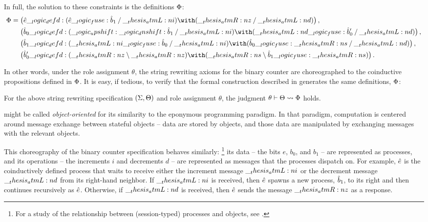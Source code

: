 %
In full, the solution to these constraints is the definitions $\Phi$:
\begin{equation*}
  \orsig =
  \begin{lgathered}[t]
    \bigl(\defp{e} \defd (\defp{e} \fuse \defp{b}_1 \pmir \atmL{i}) \with (\atmR{z} \pmir \atmL{d})\bigr) \,, \\
    \bigl(\defp{b}_0 \defd (\up \dn \defp{b}_1 \pmir \atmL{i}) \with (\atmL{d} \fuse \defp{b}'_0 \pmir \atmL{d})\bigr) \,, \\
    \bigl(\defp{b}_1 \defd (\atmL{i} \fuse \defp{b}_0 \pmir \atmL{i}) \with (\defp{b}_0 \fuse \atmR{s} \pmir \atmL{d})\bigr) \,, \\
    \bigl(\defp{b}'_0 \defd (\atmR{z} \limp \atmR{z}) \with (\atmR{s} \limp \defp{b}_1 \fuse \atmR{s})\bigr)
  \,.
  \end{lgathered}
\end{equation*}



In other words, under the role assignment $\theta$, the string rewriting axioms for the binary counter are choreographed to the coinductive propositions defined in $\Phi$.
It is easy, if tedious, to verify that 
the formal construction described in  generates the same definitions, $\Phi$:
%
\begin{proposition}
  For the above string rewriting specification $(\Sigma, \Theta)$ and role assignment $\theta$, the judgment $\theta \vdash \Theta \rightsquigarrow \Phi$ holds.
\end{proposition}

 might be called \emph{object-oriented} for its similarity to the eponymous programming paradigm.
In that paradigm, computation is centered around message exchange between stateful objects -- data are stored by objects, and those data are manipulated by exchanging messages with the relevant objects.

This choreography of the binary counter specification behaves similarly:%
\footnote{For a study of the relationship between (session-typed) processes and objects, see \textcite{Balzer+Pfenning:AGERE15}.}
its data -- the bits $e$, $b_0$, and $b_1$ -- are represented as processes, and its operations -- the increments $i$ and decrements $d$ -- are represented as messages that the processes dispatch on.
%
%
For example, $\hat{e}$ is the coinductively defined process that waits to receive either the increment message $\__thesis_atmL:n {i}$ or the decrement message $\__thesis_atmL:n {d}$ from its right-hand neighbor.
If $\__thesis_atmL:n {i}$ is received, then $\hat{e}$ spawns a new process, $\hat{b}_1$, to its right and then continues recursively as $\hat{e}$.
Otherwise, if $\__thesis_atmL:n {d}$ is received, then $\hat{e}$ sends the message $\__thesis_atmR:n {z}$ as a response.





